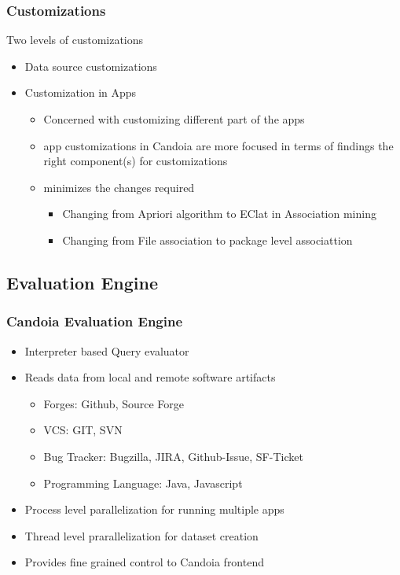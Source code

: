         \begin{frame}
        \frametitle{Customizations}
            Two levels of customizations
            \begin{itemize}
                \item Data source customizations
                \item Customization in Apps
                    \begin{itemize}
                        \item Concerned with customizing different part of the apps
                        \item app customizations in Candoia are more focused in terms of findings the right component(s) for customizations
                        \item minimizes the changes required
                            \begin{itemize}
                                \item Changing from Apriori algorithm to EClat in Association mining
                                \item Changing from File association to package level associattion
                            \end{itemize}
                        \end{itemize}
            \end{itemize}
        \end{frame}

    \subsection{Evaluation Engine}
        \begin{frame}
            \frametitle{Candoia Evaluation Engine}
            \begin{itemize}
                \item Interpreter based Query evaluator
                \item Reads data from local and remote software artifacts
                    \begin{itemize}
                        \item Forges: Github, Source Forge
                        \item VCS: GIT, SVN
                        \item Bug Tracker: Bugzilla, JIRA, Github-Issue, SF-Ticket
                        \item Programming Language: Java, Javascript
                    \end{itemize}
                \item Process level parallelization for running multiple apps
                \item Thread level prarallelization for dataset creation
                \item Provides fine grained control to Candoia frontend
                \end{itemize}
            \end{frame}



